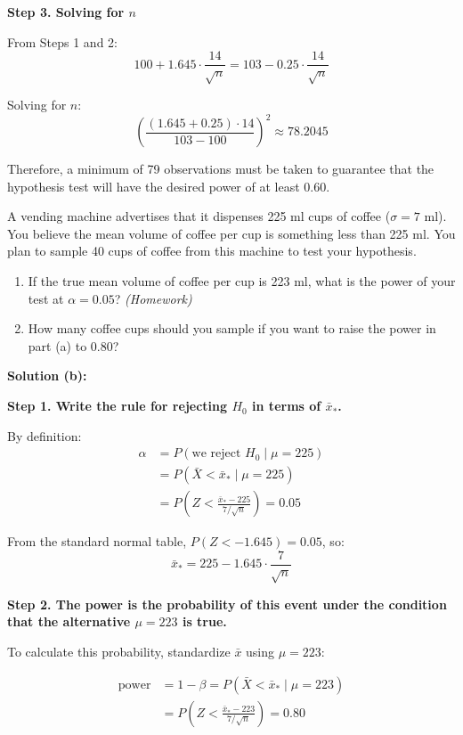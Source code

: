 \begin{example}
\vspace{1em}
\textbf{Step 3. Solving for $n$}

From Steps 1 and 2:
\[
100 + 1.645 \cdot \frac{14}{\sqrt{n}} = 103 - 0.25 \cdot \frac{14}{\sqrt{n}}
\]

Solving for $n$:
\[
\left( \frac{(1.645 + 0.25) \cdot 14}{103 - 100} \right)^2 \approx 78.2045
\]

Therefore, a minimum of 79 observations must be taken to guarantee that the hypothesis test will have the desired power of at least 0.60.
\end{example}
\begin{example}
A vending machine advertises that it dispenses 225 ml cups of coffee ($\sigma = 7$ ml). You believe the mean volume of coffee per cup is something less than 225 ml. You plan to sample 40 cups of coffee from this machine to test your hypothesis.

\begin{enumerate}[label=\textbf{\alph*)}]
\item If the true mean volume of coffee per cup is 223 ml, what is the power of your test at $\alpha = 0.05$? \textit{(Homework)}
\item How many coffee cups should you sample if you want to raise the power in part (a) to 0.80?
\end{enumerate}
\vspace{1em}
\textbf{Solution (b):}

\textbf{Step 1. Write the rule for rejecting $H_0$ in terms of $\bar{x}_*$.}

By definition:
\[
\begin{aligned}
\alpha &= P(\text{we reject } H_0 \mid \mu = 225) \\
&= P(\bar{X} < \bar{x}_* \mid \mu = 225) \\
&= P\left( Z < \frac{\bar{x}_* - 225}{7 / \sqrt{n}} \right) = 0.05
\end{aligned}
\]

From the standard normal table, $P(Z < -1.645) = 0.05$, so:
\[
\bar{x}_* = 225 - 1.645 \cdot \frac{7}{\sqrt{n}}
\]

\vspace{1em}
\textbf{Step 2. The power is the probability of this event under the condition that the alternative $\mu = 223$ is true.}

To calculate this probability, standardize $\bar{x}$ using $\mu = 223$:

\[
\begin{aligned}
\text{power} &= 1 - \beta = P(\bar{X} < \bar{x}_* \mid \mu = 223) \\
&= P\left( Z < \frac{\bar{x}_* - 223}{7 / \sqrt{n}} \right) = 0.80
\end{aligned}
\]


\end{example}
